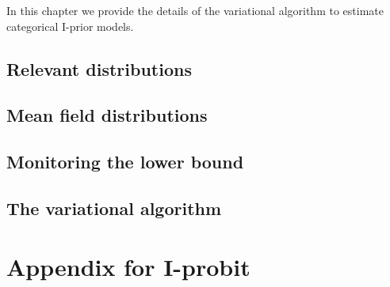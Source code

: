 \documentclass[a4paper,showframe,11pt]{report}
\begin{document}

In this chapter we provide the details of the variational algorithm to estimate categorical I-prior models.

\section{Relevant distributions}


\section{Mean field distributions}


\section{Monitoring the lower bound}


\section{The variational algorithm}


\ifstandalone
  \appendix
  \chapter{Appendix for I-probit}
  
\fi

\hClosingStuffStandalone
\end{document}
